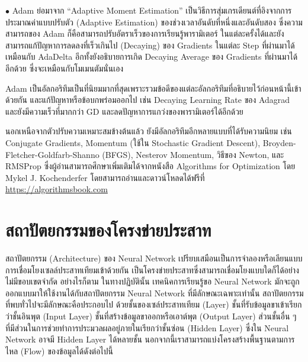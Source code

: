 \noindent $\bullet$ Adam ย่อมาจาก \enquote{Adaptive Moment Estimation} เป็นวิธีการสุ่มเกรเดียนต์ที่อิงจากการประมาณค่าแบบปรับตัว 
(Adaptive Estimation) ของช่วงเวลาอันดับที่หนึ่งและอันดับสอง ซึ่งความสามารถของ Adam ก็คือสามารถปรับอัตราเร็วของการเรียนรู้พารามิเตอร์%
ในแต่ละครั้งได้และยังสามารถแก้ปัญหาการลดลงที่เร็วเกินไป (Decaying) ของ Gradients ในแต่ละ Step ที่ผ่านมาได้เหมือนกับ AdaDelta 
อีกทั้งยังอธิบายการเกิด Decaying Average ของ Gradients ที่ผ่านมาได้อีกด้วย ซึ่งจะเหมือนกับโมเมนตัมนั่นเอง

Adam เป็นอัลกอริทึมเป็นที่นิยมมากที่สุดเพราะรวมข้อดีของแต่ละอัลกอริทึมที่อธิบายไว้ก่อนหน้านี้เข้าด้วยกัน และแก้ปัญหาหรือข้อบกพร่อมออกไป 
เช่น Decaying Learning Rate ของ Adagrad และยังมีความเร็วที่มากกว่า GD และลดปัญหาการแกว่งของพารามิเตอร์ได้อีกด้วย

นอกเหนือจากตัวปรับความเหมาะสมข้างต้นแล้ว ยังมีอัลกอริทึมอีกหลายแบบที่ได้รับความนิยม เช่น Conjugate Gradients, Momentum (ใช้ใน
Stochastic Gradient Descent), Broyden-Fletcher-Goldfarb-Shanno (BFGS), Nesterov Momentum, วิธีของ Newton, และ
RMSProp ซึ่งผู้อ่านสามารถศึกษาเพิ่มเติมได้จากหนังสือ Algorithms for Optimization\autocite{kochenderfer2019} โดย Mykel J. 
Kochenderfer โดยสามารถอ่านและดาวน์โหลดได้ฟรีที่ \url{https://algorithmsbook.com}

\section{สถาปัตยกรรมของโครงข่ายประสาท}
\label{sec:arch_nn}

สถาปัตยกรรม (Architecture) ของ Neural Network เปรียบเสมือนเป็นการจำลองหรือเลียนแบบการเชื่อมโยงเซลล์ประสาทเทียมเข้าด้วยกัน%
เป็นโครงข่ายประสาทซึ่งสามารถเชื่อมโยงแบบใดก็ได้อย่างไม่มีขอบเขตจำกัด อย่างไรก็ตาม ในทางปฏิบัตินั้น เทคนิคการเรียนรู้ขอ Neural Network 
มักจะถูกออกแบบมาให้ใช้งานได้กับสถาปัตยกรรม Neural Network ที่มีลักษณะเฉพาะเท่านั้น สถาปัตยกรรมที่พบทั่วไปจะมีลักษณะคือประกอบไป%
ด้วยชั้นของเซล์ประสาทเทียม (Layer) ชั้นที่รับข้อมูลขาเข้าเรียกว่าชั้นอินพุต (Input Layer) ชั้นที่สร้างข้อมูลขาออกหรือเอาต์พุต (Output 
Layer) ส่วนชั้นอื่น ๆ ที่มีส่วนในการช่วยทำการประมวลผลอยู่ภายในเรียกว่าชั้นซ่อน (Hidden Layer) ซึ่งใน Neural Network อาจมี Hidden 
Layer ได้หลายชั้น นอกจากนี้เราสามารถแบ่งโครงสร้างพื้นฐานตามการไหล (Flow) ของข้อมูลได้ดังต่อไปนี้


